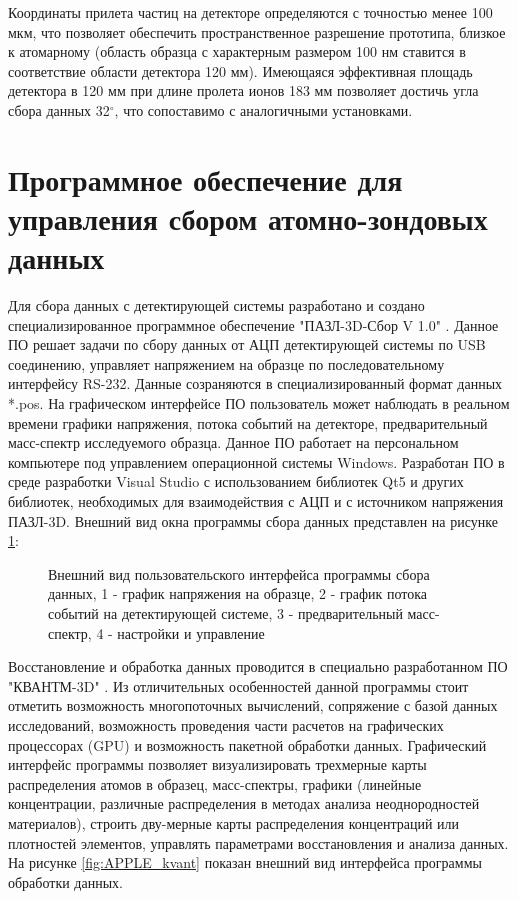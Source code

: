 Координаты прилета частиц на детекторе определяются с точностью менее 100 мкм, что позволяет обеспечить пространственное разрешение прототипа, близкое к атомарному (область образца с характерным размером 100 нм ставится в соответствие области детектора 120 мм). Имеющаяся эффективная площадь детектора в 120 мм при длине пролета ионов 183 мм позволяет достичь угла сбора данных 32$^{\circ}$, что сопоставимо с аналогичными установками.

\FloatBarrier

\section{Программное обеспечение для управления сбором атомно-зондовых данных}\label{sec:ch2/sec5}

Для сбора данных с детектирующей системы разработано и создано специализированное программное обеспечение "ПАЗЛ-3D-Сбор V 1.0" \cite{SBOR}. Данное ПО решает задачи по сбору данных от АЦП детектирующей системы по USB соединению, управляет напряжением на образце по последовательному интерфейсу RS-232. Данные созраняются в специализированный формат данных *.pos. На графическом интерфейсе ПО пользователь может наблюдать в реальном времени графики напряжения, потока событий на детекторе, предварительный масс-спектр исследуемого образца. Данное ПО работает на персональном компьютере под управлением операционной системы Windows. Разработан ПО в среде разработки Visual Studio с использованием библиотек Qt5 и других библиотек, необходимых для взаимодействия с АЦП и с источником напряжения ПАЗЛ-3D. Внешний вид окна программы сбора данных представлен на рисунке \cref{fig:APPLE_sbor}:

\begin{figure}[htb]
	\caption{Внешний вид пользовательского интерфейса программы сбора данных, 1 - график напряжения на образце, 2 - график потока событий на детектирующей системе, 3 - предварительный масс-спектр, 4 - настройки и управление}
	\label{fig:APPLE_sbor}
\end{figure}

Восстановление и обработка данных проводится в специально разработанном ПО "КВАНТМ-3D" \cite{KVANTM}. Из отличительных особенностей данной программы стоит отметить возможность многопоточных вычислений, сопряжение с базой данных исследований, возможность проведения части расчетов на графических процессорах (GPU) и возможность пакетной обработки данных. Графический интерфейс программы позволяет визуализировать трехмерные карты распределения атомов в образец, масс-спектры, графики (линейные концентрации, различные распределения в методах анализа неоднородностей материалов), строить дву-мерные карты распределения концентраций или плотностей элементов, управлять параметрами восстановления и анализа данных. На рисунке \cref{fig:APPLE_kvant} показан внешний вид интерфейса программы обработки данных.

